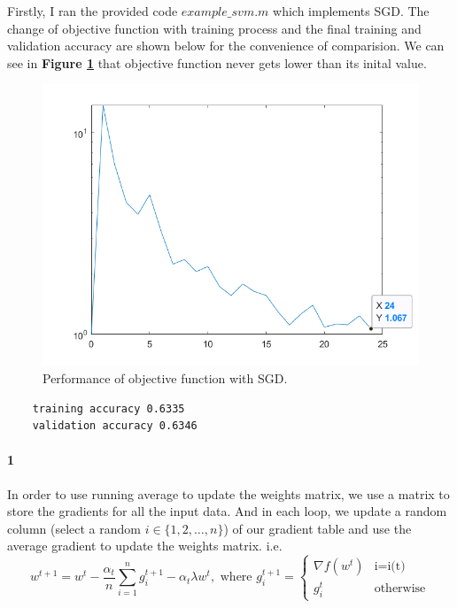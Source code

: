 \documentclass{article}
\begin{document}
Firstly, I ran the provided code $example\_svm.m$ which implements SGD. The change of objective function with training process and the final training and validation accuracy are shown below for the convenience of comparision. We can see in \textbf{Figure \ref{fig17}} that objective function never gets lower than its inital value.

\begin{figure}[H]
	\centering
	\includegraphics[scale=0.5]{figure17}
	\caption{Performance of objective function with SGD.}
	\label{fig17}
\end{figure}

\begin{commandline}
	\begin{verbatim}
	training accuracy 0.6335
	validation accuracy 0.6346
	\end{verbatim}
\end{commandline}

\paragraph{1}
In order to use running average to update the weights matrix, we use a matrix to store the gradients for all the input data. And in each loop, we update a random column (select a random $i\in\{1,2,\dots,n\}$) of our gradient table and use the average gradient to update the weights matrix. i.e.
\[
w^{t+1}=w^t-\frac{\alpha_t}{n}\sum_{i=1}^{n}g_i^{t+1}-\alpha_t\lambda w^t ,\text{ where } g_i^{t+1}=
\begin{cases}
\nabla f(w^t)& \text{i=i(t)}\\
g_i^t& \text{otherwise}
\end{cases}
\]
\end{document}
